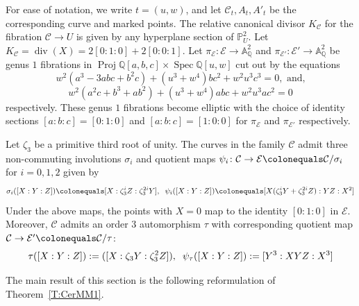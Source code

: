 \documentclass[reqno,10pt]{amsart}
\theoremstyle{definition}
\theoremstyle{definition}
\def\Q{{\mathbb Q}}
\DeclareMathOperator{\Spec}{Spec}
\DeclareMathOperator{\proj}{Proj}
\DeclareMathOperator{\divi}{div}
\begin{document}
For ease of notation, we write $t=(u,w)$, and let $\mathcal{C}_t, A_t,A'_t$ be the corresponding curve and marked points. The relative canonical divisor $K_\mathcal{C}$ for the fibration $\mathcal{C} \rightarrow U$ is given by any hyperplane section of $\mathbb{P}^2_U$. Let
$K_{\mathcal{C}}=\divi(X)=2[0:1:0]+2[0:0:1]$. Let $\pi_{\mathcal{E}} \colon\mathcal{E} \rightarrow \mathbb{A}^2_{\Q}$ and $\pi_{\mathcal{E}'} \colon \mathcal{E}' \rightarrow \mathbb{A}^2_{\Q}$ be genus $1$ fibrations in $\proj \Q[a,b,c] \times \Spec \Q[u,w]$ cut out by the equations
\[w^2(a^3-3abc+b^2c)+(u^3+w^4)bc^2+w^2u^3c^3 = 0, \text{ and,}\]
\[ w^2(a^2c+b^3+ab^2)+(u^3+w^4)abc+w^2u^3ac^2 = 0 \]  
respectively. These genus $1$ fibrations become elliptic with the choice of identity sections $[a:b:c]=[0:1:0]$ and $[a:b:c]=[1:0:0]$ for $\pi_{\mathcal{E}}$ and $\pi_{\mathcal{E}'}$ respectively.

Let $\zeta_3$ be a primitive third root of unity. The curves in the family $\mathcal{C}$ admit three non-commuting involutions $\sigma_i$ and quotient maps $\psi_i \colon \mathcal{C} \to \mathcal{E} \colonequals \mathcal{C}/\sigma_i$ for $i=0,1,2$ given by 
\begin{equation}\label{E:quot}
\sigma_i([X:Y:Z]) \colonequals [X:\zeta_3^i Z:\zeta_3^{2i} Y], \hspace{2mm }\psi_i([X:Y:Z]) \colonequals [X(\zeta_3^i Y+\zeta_3^{2i} Z):YZ:X^2]
\end{equation}
Under the above maps, the points with $X=0$ map to the identity $[0:1:0]$ in $\mathcal{E}$.
Moreover, $\mathcal{C}$ admits  an order $3$ automorphism $\tau$ with corresponding quotient map $\mathcal{C}\rightarrow \mathcal{E}^{\prime} \colonequals \mathcal{C}/\tau$:
\begin{equation}\label{E':quot}
\tau([X:Y:Z]):=([X:\zeta_3 Y:\zeta_3^2 Z]), \hspace{2mm} \psi_{\tau}([X:Y:Z]):=[Y^3:XYZ:X^3]   
\end{equation}

The main result of this section is the following  reformulation of Theorem~\ref{T:CerMM1}.

\vspace{2mm}

\begin{center}
     \end{center}
\end{document}

